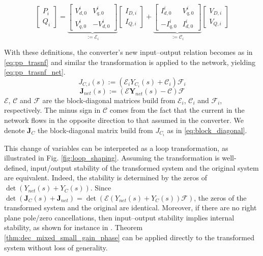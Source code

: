 \begin{equation}
    \begin{bmatrix}
        P_i \\ Q_i
    \end{bmatrix} = \underbrace{\begin{bmatrix}
        V^i_{d,0} & V^i_{q,0}  \\
        V^i_{q,0} & -V^i_{d,0}
    \end{bmatrix}}_{:=\mathcal{E}_i} \begin{bmatrix}
        I_{D,i} \\ I_{Q,i} 
    \end{bmatrix} + 
    \underbrace{\begin{bmatrix}
        I^i_{d,0} & V^i_{q,0}  \\
        -I^i_{q,0} & I^i_{d,0}
    \end{bmatrix}}_{:=\mathcal{C}_i}
    \begin{bmatrix}
        V_{D,i} \\ V_{Q,i} 
    \end{bmatrix}
    \label{eq:change_of_coord_2}
\end{equation}

With these definitions, the converter’s new input–output relation becomes as in \ref{eq:pp_trasnf} and similar the transformation is applied to the network, yielding \ref{eq:pp_trasnf_net}.
\begin{equation}
    J_{C,i}(s) :=(\mathcal{E}_iY_{C_i}(s)+\mathcal{C}_i)\mathcal{F}_i
    \label{eq:pp_trasnf}
\end{equation}
\begin{equation}
    \mathbf{J}_{net}(s) :=(\boldsymbol{\mathcal{E}}\mathbf{Y}_{net}(s)-\boldsymbol{\mathcal{C}})\boldsymbol{\mathcal{F}}
    \label{eq:pp_trasnf_net}
\end{equation}
$\boldsymbol{\mathcal{E}}$, $\boldsymbol{\mathcal{C}}$ and $\boldsymbol{\mathcal{F}}$ are the block-diagonal matrices build from $\mathcal{E}_i$, $\mathcal{C}_i$ and $\mathcal{F}_i$, respectively. The minus sign in $\mathcal{C}$ comes from the fact that the current in the network flows in the opposite direction to that assumed in the converter. We denote $\mathbf{J}_C$ the block-diagonal matrix build from $J_{C_i}$ as in \eqref{eq:block_diagonal}.

This change of variables can be interpreted as a loop transformation, as illustrated in Fig. \ref{fig:loop_shaping}. 
Assuming the transformation is well-defined, input/output stability of the transformed system and the original system are equivalent. Indeed, the stability is determined by the zeros of $\det(Y_{net}(s)+Y_C(s))$. Since $\det(\mathbf{J}_C(s) +\mathbf{J}_{net}) = \det(\mathcal{E}(Y_{net}(s)+Y_{C}(s))\mathcal{F})$, the zeros of the transformed system and the original are identical. Moreover, if there are no right plane pole/zero cancellations, then
 input–output stability implies internal stability, as shown for instance in \cite{häberle2025decentralizedparametricstabilitycertificates}. Theorem \ref{thm:dec_mixed_small_gain_phase} can be applied directly to the transformed system without loss of generality.

